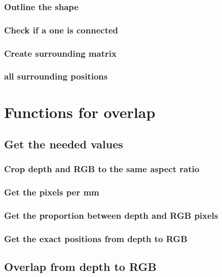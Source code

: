 \documentclass[10pt]{article}
\begin{document}
\subsubsection{Outline the shape}

\subsubsection{Check if a one is connected}

\subsubsection{Create surrounding matrix}

\subsubsection{all surrounding positions}


\section{Functions for overlap}
\subsection{Get the needed values}
\subsubsection{Crop depth and RGB to the same aspect ratio}

\subsubsection{Get the pixels per mm}

\subsubsection{Get the proportion between depth and RGB pixels}

\subsubsection{Get the exact positions from depth to RGB}

\subsection{Overlap from depth to RGB}

\end{document}
